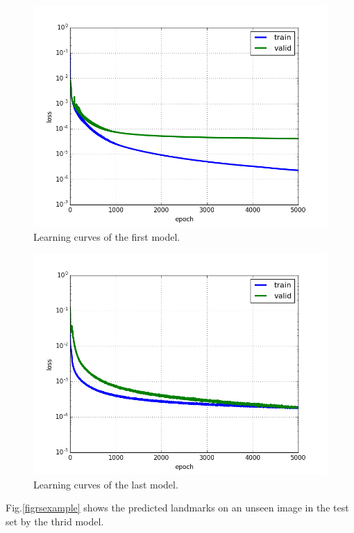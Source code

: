 \documentclass[conference]{IEEEtran}
\begin{document}
\begin{figure}[htbp]
	\centerline{\includegraphics[scale=0.3]{images/loss_model_1}}
	\caption{Learning curves of the first model.}
	\label{figloss1}
\end{figure}
\begin{figure}[htbp]
	\centerline{\includegraphics[scale=0.35]{images/loss_v16}}
	\caption{Learning curves of the last model.}
	\label{figloss}
\end{figure}

Fig.\ref{figrsexample} shows the predicted landmarks on an unseen image in the test set by the thrid model. 
\end{document}
